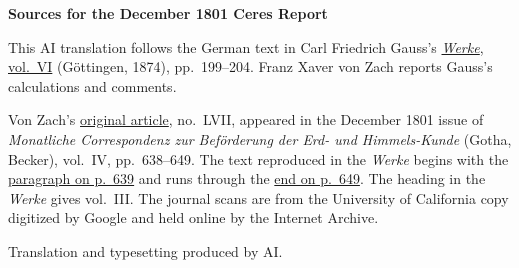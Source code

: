\clearpage\thispagestyle{empty}
\begin{center}\textbf{Sources for the December 1801 Ceres Report}\end{center}
\noindent This AI translation follows the German text in Carl Friedrich Gauss’s \href{https://gdz.sub.uni-goettingen.de/id/PPN236007467}{\textit{Werke}, vol.~VI} (Göttingen, 1874), pp.~199--204. Franz Xaver von Zach reports Gauss’s calculations and comments.
\par\smallskip\noindent Von Zach’s \href{https://archive.org/download/bub_gb_8mY7AQAAIAAJ/page/n544.jpg}{original article}, no.~LVII, appeared in the December 1801 issue of \textit{Monatliche Correspondenz zur Beförderung der Erd- und Himmels-Kunde} (Gotha, Becker), vol.~IV, pp.~638--649. The text reproduced in the \textit{Werke} begins with the \href{https://archive.org/download/bub_gb_8mY7AQAAIAAJ/page/n545.jpg}{paragraph on p.~639} and runs through the \href{https://archive.org/download/bub_gb_8mY7AQAAIAAJ/page/n555.jpg}{end on p.~649}. The heading in the \textit{Werke} gives vol.~III. The journal scans are from the University of California copy digitized by Google and held online by the Internet Archive.
\par\smallskip\noindent Translation and typesetting produced by AI.
\clearpage
